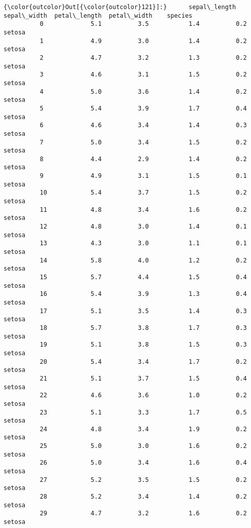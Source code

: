 \documentclass[11pt]{article}
\begin{document}
\begin{Verbatim}[commandchars=\\\{\}]
{\color{outcolor}Out[{\color{outcolor}121}]:}      sepal\_length  sepal\_width  petal\_length  petal\_width    species
          0             5.1          3.5           1.4          0.2     setosa
          1             4.9          3.0           1.4          0.2     setosa
          2             4.7          3.2           1.3          0.2     setosa
          3             4.6          3.1           1.5          0.2     setosa
          4             5.0          3.6           1.4          0.2     setosa
          5             5.4          3.9           1.7          0.4     setosa
          6             4.6          3.4           1.4          0.3     setosa
          7             5.0          3.4           1.5          0.2     setosa
          8             4.4          2.9           1.4          0.2     setosa
          9             4.9          3.1           1.5          0.1     setosa
          10            5.4          3.7           1.5          0.2     setosa
          11            4.8          3.4           1.6          0.2     setosa
          12            4.8          3.0           1.4          0.1     setosa
          13            4.3          3.0           1.1          0.1     setosa
          14            5.8          4.0           1.2          0.2     setosa
          15            5.7          4.4           1.5          0.4     setosa
          16            5.4          3.9           1.3          0.4     setosa
          17            5.1          3.5           1.4          0.3     setosa
          18            5.7          3.8           1.7          0.3     setosa
          19            5.1          3.8           1.5          0.3     setosa
          20            5.4          3.4           1.7          0.2     setosa
          21            5.1          3.7           1.5          0.4     setosa
          22            4.6          3.6           1.0          0.2     setosa
          23            5.1          3.3           1.7          0.5     setosa
          24            4.8          3.4           1.9          0.2     setosa
          25            5.0          3.0           1.6          0.2     setosa
          26            5.0          3.4           1.6          0.4     setosa
          27            5.2          3.5           1.5          0.2     setosa
          28            5.2          3.4           1.4          0.2     setosa
          29            4.7          3.2           1.6          0.2     setosa

\end{Verbatim}
\end{document}
